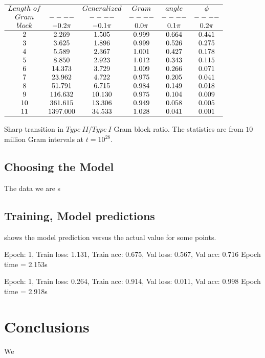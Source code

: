 \documentclass[twoside]{article}
\begin{document}
\begin{table}
\centering \(\begin{array}{cccccc}
\hline
Length~of  && Generalized &Gram&angle &\phi \\
Gram     &----&----&----&----&----\\
block  & -0.2\pi & -0.1\pi & 0.0\pi & 0.1\pi & 0.2\pi  \\
\hline
2 &2.269 &1.505 &0.999 &0.664 &0.441 \\
3 &3.625 &1.896 &0.999 &0.526 &0.275 \\
4 &5.589 &2.367 &1.001 &0.427 &0.178 \\
5 &8.850 &2.923 &1.012 &0.343 &0.115 \\
6 &14.373 &3.729 &1.009 &0.266 &0.071 \\
7 &23.962 &4.722 &0.975 &0.205 &0.041 \\
8 &51.791 &6.715 &0.984 &0.149 &0.018 \\
9 &116.632 &10.130 &0.975 &0.104 &0.009 \\
10 &361.615 &13.306 &0.949 &0.058 &0.005 \\
11 &1397.000 &34.533 &1.028 &0.041 &0.001 \\
\hline
\end{array}\)
\caption{Sharp transition in $Type~II/Type~I$ Gram block ratio.
The statistics are from $10$ million Gram intervals at $t=10^{28}$.}
\label{tab:ratioE28}
\end{table}



\subsection{\label{sec3.1} Choosing the Model}
The data we are s

\subsection{\label{relation}Training,  Model predictions}

shows the model prediction versus the actual value for some points.

Epoch: 1, Train loss: 1.131, Train acc: 0.675, Val loss: 0.567, Val acc: 0.716 Epoch time = 2.153s

Epoch: 1, Train loss: 0.264, Train acc: 0.914, Val loss: 0.011, Val acc: 0.998 Epoch time = 2.918s


\section{\label{conclusions}Conclusions}
We 
\end{document}
